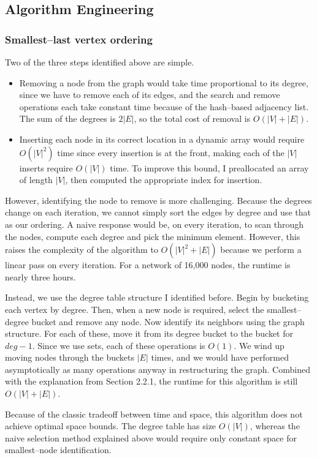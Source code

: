 \documentclass[oneside, titlepage]{scrartcl}
\begin{document}
\subsection{Algorithm Engineering}
\subsubsection{Smallest--last vertex ordering}
Two of the three steps identified above are simple. 
\begin{itemize}
\item
Removing a node from the graph would take time proportional to its degree, since we have to remove each of its edges, and the search and remove operations each take constant time because of the hash--based adjacency list. The sum of the degrees is $2|E|$, so the total cost of removal is $O(|V| + |E|)$.
\item
Inserting each node in its correct location in a dynamic array would require $O(|V|^2)$ time since every insertion is at the front, making each of the $|V|$ inserts require $O(|V|)$ time. To improve this bound, I preallocated an array of length $|V|$, then computed the appropriate index for insertion.
\end{itemize} 

However, identifying the node to remove is more challenging. Because the degrees change on each iteration, we cannot simply sort the edges by degree and use that as our ordering. A naive response would be, on every iteration, to scan through the nodes, compute each degree and pick the minimum element. However, this raises the complexity of the algorithm to $O(|V|^2 + |E|)$ because we perform a linear pass on every iteration. For a network of 16,000 nodes, the runtime is nearly three hours. 

Instead, we use the degree table structure I identified before. Begin by bucketing each vertex by degree. Then, when a new node is required, select the smallest--degree bucket and remove any node. Now identify its neighbors using the graph structure. For each of these, move it from its degree bucket to the bucket for $deg-1$. Since we use sets, each of these operations is $O(1)$. We wind up moving nodes through the buckets $|E|$ times, and we would have performed asymptotically as many operations anyway in restructuring the graph. Combined with the explanation from Section 2.2.1, the runtime for this algorithm is still $O(|V| + |E|)$.

Because of the classic tradeoff between time and space, this algorithm does not achieve optimal space bounds. The degree table has size $O(|V|)$, whereas the naive selection method explained above would require only constant space for smallest--node identification. 
\end{document}
